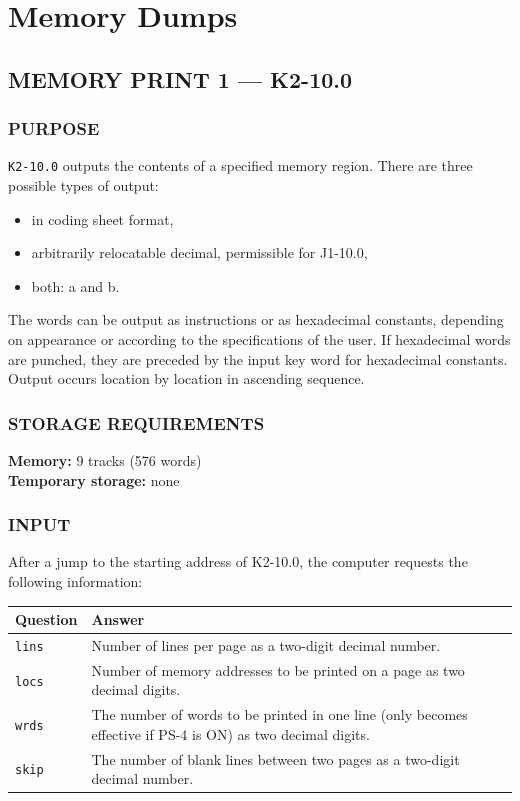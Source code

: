 \section{Memory Dumps}
\subsection*{MEMORY PRINT 1 --- K2-10.0}

\subsubsection*{PURPOSE}
\texttt{K2-10.0} outputs the contents of a specified memory region. There are three possible types of output:
\begin{itemize}
    \item[a)] in coding sheet format,
    \item[b)] arbitrarily relocatable decimal, permissible for J1-10.0,
    \item[c)] both: a and b.
\end{itemize}
The words can be output as instructions or as hexadecimal constants, depending on appearance or according to the specifications of the user. If hexadecimal words are punched, they are preceded by the input key word for hexadecimal constants. Output occurs location by location in ascending sequence.

\subsubsection*{STORAGE REQUIREMENTS}
\textbf{Memory:} 9 tracks (576 words) \\
\textbf{Temporary storage:} none

\subsubsection*{INPUT}
After a jump to the starting address of K2-10.0, the computer requests the following information:

\begin{table}[h!]
\centering
\begin{tabularx}{\textwidth}{lX}
\toprule
\textbf{Question} & \textbf{Answer} \\
\midrule
\texttt{lins} & Number of lines per page as a two-digit decimal number. \\
\texttt{locs} & Number of memory addresses to be printed on a page as two decimal digits. \\
\texttt{wrds} & The number of words to be printed in one line (only becomes effective if PS-4 is ON) as two decimal digits. \\
\texttt{skip} & The number of blank lines between two pages as a two-digit decimal number. \\
\bottomrule
\end{tabularx}
\end{table}

